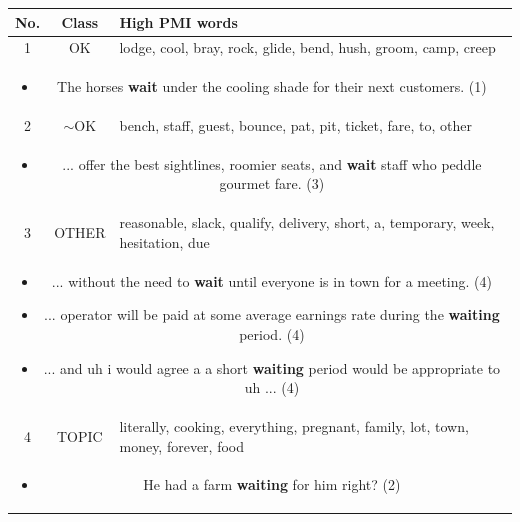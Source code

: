 \documentclass[11pt,a4paper]{article}
\begin{document}
\begin{table}[ht!]
\centering
\begin{tabularx}{\linewidth}{| c | c | X  |}
	\hline

	\textbf{No.} & Class & \textbf{High PMI words} \\ \hline \hline 
    1 & OK & lodge, cool, bray, rock, glide, bend, hush, groom, camp, creep \\ \hline
    \multicolumn{3}{|p{0.92\linewidth}|}{
    \begin{itemize}[topsep=0pt,itemsep=0pt,partopsep=0pt, parsep=0pt]
        \item The horses {\bf wait} under the cooling shade for their next customers. (1)
    \end{itemize}
  } \\
  \hline\hline
  2 & $\sim$OK & bench, staff, guest, bounce, pat, pit, ticket, fare, to, other \\ \hline
    \multicolumn{3}{|p{0.92\linewidth}|}{
    \begin{itemize}[topsep=0pt,itemsep=0pt,partopsep=0pt, parsep=0pt]
        \item ... offer the best sightlines, roomier seats, and {\bf wait} staff who peddle gourmet fare. (3)
    \end{itemize}
  }\\
  \hline\hline
    3 & OTHER & reasonable, slack, qualify, delivery, short, a, temporary, week, hesitation, due \\ \hline
    \multicolumn{3}{|p{0.92\linewidth}|}{
    \begin{itemize}[topsep=2pt,itemsep=0pt,partopsep=0pt, parsep=0pt]
        \item ... without the need to {\bf wait} until everyone is in town for a meeting. (4)
        \item ... operator will be paid at some average earnings rate during the {\bf waiting} period. (4)
      \item ... and uh i would agree a a short {\bf waiting} period would be appropriate to uh ... (4)
    \end{itemize}
  }\\
  \hline\hline
    4  & TOPIC & literally, cooking, everything, pregnant, family, lot, town, money, forever, food \\ \hline
    \multicolumn{3}{|p{0.92\linewidth}|}{
    \begin{itemize}[topsep=0pt,itemsep=0pt,partopsep=0pt, parsep=0pt]
        \item He had a farm {\bf waiting} for him right? (2)

\end{itemize}}
\end{tabularx}
\end{table}
\end{document}
